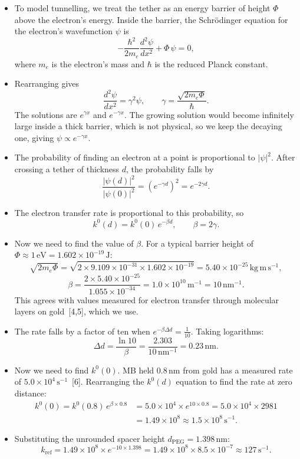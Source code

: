 \documentclass[10pt,a4paper]{article}
\numberwithin{equation}{section}
\newcommand{\cit}[1]{[#1]}
\newcommand{\nm}{\,\mathrm{nm}}
\newcommand{\dpeg}{d_{\mathrm{PEG}}}
\newcommand{\kref}{k_{\mathrm{ref}}}
\newcommand{\dropdown}{\par\medskip}
\begin{document}
\dropdown
\begin{itemize}
  \item To model tunnelling, we treat the tether as an energy barrier of height $\Phi$ above the electron's energy. Inside the barrier, the Schr\"odinger equation for the electron's wavefunction $\psi$ is
  \[ -\frac{\hbar^2}{2m_e}\frac{d^2\psi}{dx^2} + \Phi\,\psi = 0, \]
  where $m_e$ is the electron's mass and $\hbar$ is the reduced Planck constant.
  \item Rearranging gives
  \[ \frac{d^2\psi}{dx^2} = \gamma^2\psi, \qquad \gamma = \frac{\sqrt{2m_e\Phi}}{\hbar}. \]
  The solutions are $e^{\gamma x}$ and $e^{-\gamma x}$. The growing solution would become infinitely large inside a thick barrier, which is not physical, so we keep the decaying one, giving $\psi\propto e^{-\gamma x}$.
  \item The probability of finding an electron at a point is proportional to $|\psi|^2$. After crossing a tether of thickness $d$, the probability falls by
  \[ \frac{|\psi(d)|^2}{|\psi(0)|^2} = \left(e^{-\gamma d}\right)^2 = e^{-2\gamma d}. \]
  \item The electron transfer rate is proportional to this probability, so
  \[ k^0(d) = k^0(0)\,e^{-\beta d}, \qquad \beta = 2\gamma. \]
  \item Now we need to find the value of $\beta$. For a typical barrier height of $\Phi\approx1\,\mathrm{eV} = 1.602\times10^{-19}\,\mathrm{J}$:
  \[ \sqrt{2m_e\Phi} = \sqrt{2\times9.109\times10^{-31}\times1.602\times10^{-19}} = 5.40\times10^{-25}\,\mathrm{kg\,m\,s^{-1}}, \]
  \[ \beta = \frac{2\times5.40\times10^{-25}}{1.055\times10^{-34}} = 1.0\times10^{10}\,\mathrm{m^{-1}} = 10\,\mathrm{nm^{-1}}. \]
  This agrees with values measured for electron transfer through molecular layers on gold~\cit{4,5}, which we use.
  \item The rate falls by a factor of ten when $e^{-\beta\Delta d} = \frac{1}{10}$. Taking logarithms:
  \[ \Delta d = \frac{\ln 10}{\beta} = \frac{2.303}{10\,\mathrm{nm^{-1}}} = 0.23\nm. \]
  \item Now we need to find $k^0(0)$. MB held $0.8\nm$ from gold has a measured rate of $5.0\times10^4\,\mathrm{s^{-1}}$~\cit{6}. Rearranging the $k^0(d)$ equation to find the rate at zero distance:
  \begin{align*}
  k^0(0) = k^0(0.8)\,e^{\beta\times0.8} &= 5.0\times10^4\times e^{10\times0.8} = 5.0\times10^4\times2981\\
  &= 1.49\times10^8 \approx 1.5\times10^8\,\mathrm{s^{-1}}.
  \end{align*}
  \item Substituting the unrounded spacer height $\dpeg = 1.398\nm$:
  \[ \kref = 1.49\times10^8\times e^{-10\times1.398} = 1.49\times10^8\times8.5\times10^{-7} \approx 127\,\mathrm{s^{-1}}. \]
\end{itemize}
\end{document}
